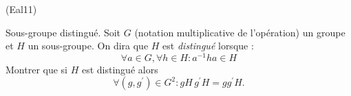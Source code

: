 \begin{tiny}(Eal11)\end{tiny} Sous-groupe distingué.\newline
Soit $G$ (notation multiplicative de l'opération) un groupe et $H$ un sous-groupe. On dira que $H$ est \emph{distingué} lorsque :
\begin{displaymath}
 \forall a\in G , \forall h\in H : a^{-1}ha \in H
\end{displaymath}
Montrer que si $H$ est distingué alors 
\begin{displaymath}
 \forall (g,g^\prime)\in G^2 : gH\,g^\prime H = gg^\prime H.
\end{displaymath}
